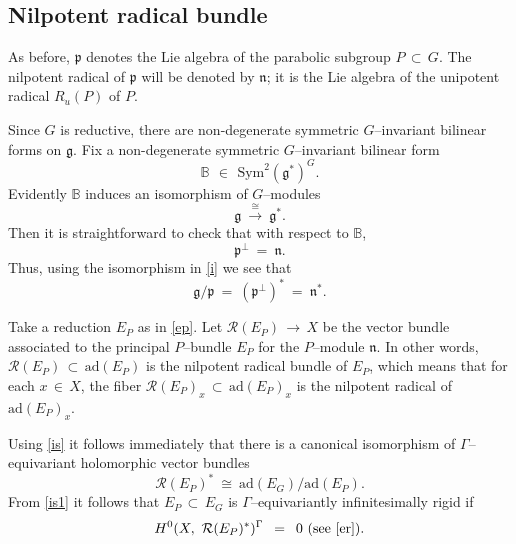 \documentclass[12pt, reqno]{amsart}
\numberwithin{equation}{section}
\newcommand{\ad}{\textrm{ad}}
\begin{document}
\subsection{Nilpotent radical bundle}\label{s2.4}

As before, $\mathfrak p$ denotes the Lie algebra of the parabolic subgroup $P\, \subset\, G$. The
nilpotent radical of $\mathfrak p$ will be denoted by $\mathfrak{n}$; it is the Lie algebra of the
unipotent radical $R_{u}(P)$ of $P$.

Since $G$ is reductive, there are non-degenerate symmetric $G$--invariant bilinear
forms on $\mathfrak{g}$. 
Fix a non-degenerate symmetric $G$--invariant bilinear form
$$
{\mathbb B}\ \, \in\ \, \text{Sym}^2(\mathfrak{g}^*)^G.
$$
Evidently $\mathbb B$ induces an isomorphism of $G$--modules
\begin{equation}\label{i}
\mathfrak{g}\ \overset{\cong}{\longrightarrow}\ \mathfrak{g}^{*}.
\end{equation}
Then it is straightforward to check that with respect to $\mathbb B$,
\[\mathfrak{p}^{\perp}\ =\ \mathfrak{n}.\]
Thus, using the isomorphism in \eqref{i} we see that 
\begin{equation}\label{is}
\mathfrak{g}/\mathfrak{p}\ =\ (\mathfrak{p}^{\perp})^*\ = \ \mathfrak{n}^{*}.
\end{equation}

Take a reduction $E_P$ as in \eqref{ep}. Let $\mathcal{R}(E_{P})\, \longrightarrow\, X$ be the
vector bundle associated to the principal $P$--bundle $E_P$ for the $P$--module $\mathfrak{n}$.
In other words, $\mathcal{R}(E_{P})\,\subset\, \text{ad}(E_P)$ is the nilpotent radical bundle of $E_{P}$,
which means that for each $x\, \in\, X$, the fiber $\mathcal{R}(E_{P})_x\,\subset\, \text{ad}(E_P)_x$ is the
nilpotent radical of $\text{ad}(E_P)_x$.

Using \eqref{is} it follows immediately that there is a canonical isomorphism of $\Gamma$--equivariant holomorphic
vector bundles
\begin{equation}\label{is1}
\mathcal{R}(E_{P})^{*}\ \cong\ \ad(E_{G})/\ad(E_{P}).
\end{equation}
{}From \eqref{is1} it follows that $E_P\, \subset\, E_G$ is $\Gamma$--equivariantly infinitesimally rigid
if
\begin{equation}\label{er2}
H^{0}(X,\ \mathcal{R}(E_{P})^{*})^{\Gamma}\,\ =\,\ 0~(\textrm{see}~ \eqref{er}).
\end{equation}
\end{document}
